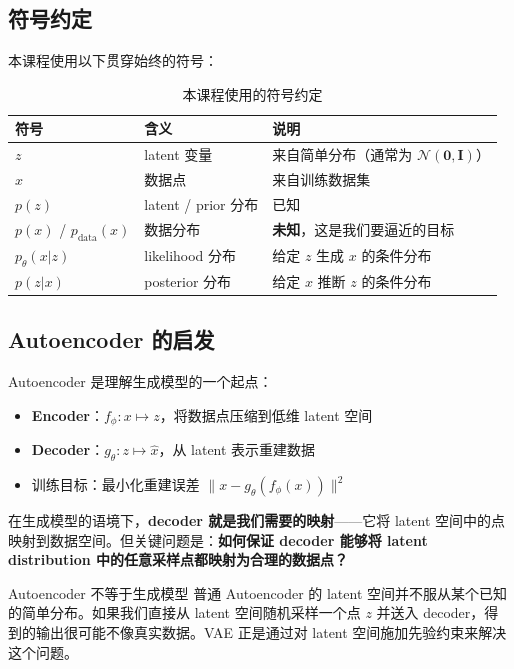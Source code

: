 \documentclass[a4paper]{article}
\begin{document}
\subsection{符号约定}

本课程使用以下贯穿始终的符号：

\begin{table}[H]
\centering
\begin{tabular}{lll}
\toprule
符号 & 含义 & 说明 \\
\midrule
$z$ & latent 变量 & 来自简单分布（通常为 $\mathcal{N}(\mathbf{0}, \mathbf{I})$） \\
$x$ & 数据点 & 来自训练数据集 \\
$p(z)$ & latent / prior 分布 & 已知 \\
$p(x)$ / $p_{\text{data}}(x)$ & 数据分布 & \textbf{未知}，这是我们要逼近的目标 \\
$p_\theta(x|z)$ & likelihood 分布 & 给定 $z$ 生成 $x$ 的条件分布 \\
$p(z|x)$ & posterior 分布 & 给定 $x$ 推断 $z$ 的条件分布 \\
\bottomrule
\end{tabular}
\caption{本课程使用的符号约定}
\end{table}

\subsection{Autoencoder 的启发}

Autoencoder 是理解生成模型的一个起点：

\begin{itemize}
    \item \textbf{Encoder}：$f_\phi: x \mapsto z$，将数据点压缩到低维 latent 空间
    \item \textbf{Decoder}：$g_\theta: z \mapsto \hat{x}$，从 latent 表示重建数据
    \item 训练目标：最小化重建误差 $\|x - g_\theta(f_\phi(x))\|^2$
\end{itemize}

在生成模型的语境下，\textbf{decoder 就是我们需要的映射}——它将 latent 空间中的点映射到数据空间。但关键问题是：\textbf{如何保证 decoder 能够将 latent distribution 中的任意采样点都映射为合理的数据点？}

\begin{warningbox}{Autoencoder 不等于生成模型}
普通 Autoencoder 的 latent 空间并不服从某个已知的简单分布。如果我们直接从 latent 空间随机采样一个点 $z$ 并送入 decoder，得到的输出很可能不像真实数据。VAE 正是通过对 latent 空间施加先验约束来解决这个问题。
\end{warningbox}
\end{document}
